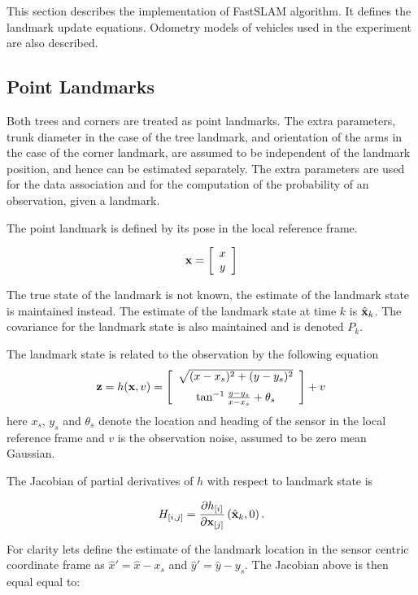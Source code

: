 This section describes the implementation of FastSLAM algorithm. It
defines the landmark update equations. Odometry models of vehicles
used in the experiment are also described.


\subsection{Point Landmarks}

Both trees and corners are treated as point landmarks. The extra
parameters, trunk diameter in the case of the tree landmark, and
orientation of the arms in the case of the corner landmark, are
assumed to be independent of the landmark position, and hence can be
estimated separately. The extra parameters are used for the data
association and for the computation of the probability of an
observation, given a landmark.

The point landmark is defined by its pose in the local reference
frame.

$$
{\bf x} = \left[ \begin{array}{c} x\\y \end{array} \right]
$$

The true state of the landmark is not known, the estimate of the
landmark state is maintained instead. The estimate of the landmark
state at time $k$ is $\hat{\bf x}_k$. The covariance for the landmark
state is also maintained and is denoted $P_k$.

The landmark state is related to the observation by the following equation
$$
  {\bf z} = h({\bf x},v) = \left[
\begin{array}{c}
\sqrt{(x-x_s)^2 + (y-y_s)^2}\\ \noalign{\medskip}
\tan^{-1} \frac{y-y_s}{x-x_s} + \theta_s
\end{array}
\right] + v
$$
here $x_s$, $y_s$ and $\theta_s$ denote the location and heading of
the sensor in the local reference frame and $v$ is the observation noise,
assumed to be zero mean Gaussian.

The Jacobian of partial derivatives of $h$ with respect to landmark
state is

$$
H_{[i,j]} = \frac{\partial h_{[i]}}{\partial {\bf x}_{[j]}}
             \left(\hat{\bf x}_k , 0 \right).
$$

For clarity lets define the estimate of the landmark location in the
sensor centric coordinate frame as $\hat{x}' = \hat{x} - x_s$ and
$\hat{y}' = \hat{y} - y_s$. The Jacobian above is then equal equal to:

